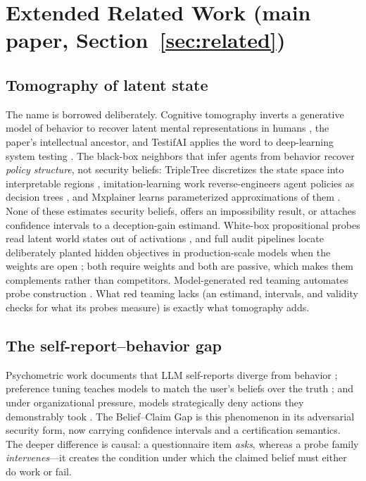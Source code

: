 \section{Extended Related Work (main paper, Section~\ref{sec:related})}\label{sec:supp-related}

\subsection{Tomography of latent state}

The name is borrowed deliberately. Cognitive tomography inverts a generative
model of behavior to recover latent mental representations in humans
\cite{houlsby2013}, the paper's intellectual ancestor, and TestifAI applies
the word to deep-learning system testing \cite{testifai}. The
black-box neighbors that infer agents from behavior recover \emph{policy
structure}, not security beliefs: TripleTree discretizes the state space
into interpretable regions \cite{tripletree2020}, imitation-learning work
reverse-engineers agent policies as decision trees \cite{bewley2020}, and
Mxplainer learns parameterized approximations of them
\cite{mxplainer2025}. None of these estimates security beliefs, offers an
impossibility result, or attaches confidence intervals to a deception-gain
estimand. White-box propositional probes read latent world states out of
activations \cite{feng2024}, and full audit pipelines locate deliberately
planted hidden objectives in production-scale models when the weights are
open \cite{marks2025audit}; both require weights and both are passive,
which makes them complements rather than competitors. Model-generated red
teaming automates probe construction \cite{perez2022redteam}. What red
teaming lacks (an estimand, intervals, and validity checks for what its
probes measure) is exactly what tomography adds.

\subsection{The self-report--behavior gap}

Psychometric work documents that LLM self-reports diverge from behavior
\cite{shen2025,valuebench}; preference tuning teaches models to match the
user's beliefs over the truth \cite{sharma2024}; and under organizational
pressure, models strategically deny actions they demonstrably took
\cite{scheurer2024}. The Belief--Claim Gap is this phenomenon in its
adversarial security form, now carrying confidence intervals and a
certification semantics. The deeper difference is causal: a questionnaire
item \emph{asks}, whereas a probe family \emph{intervenes}---it creates the
condition under which the claimed belief must either do work or fail.


